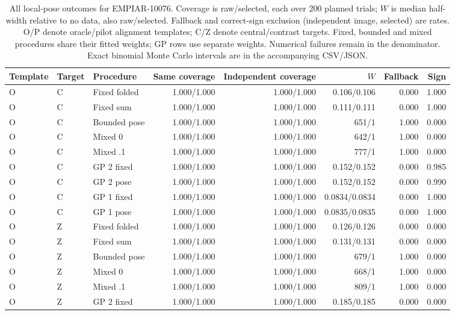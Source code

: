 \begin{table}[!t]
\centering\footnotesize
\caption{All local-pose outcomes for EMPIAR-10076. Coverage is raw/selected, each over 200 planned trials; $W$ is median half-width relative to no data, also raw/selected. Fallback and correct-sign exclusion (independent image, selected) are rates. O/P denote oracle/pilot alignment templates; C/Z denote central/contrast targets. Fixed, bounded and mixed procedures share their fitted weights; GP rows use separate weights. Numerical failures remain in the denominator. Exact binomial Monte Carlo intervals are in the accompanying CSV/JSON.}
\begin{tabular}{lllrrrrr}
\toprule
Template & Target & Procedure & Same coverage & Independent coverage & $W$ & Fallback & Sign \\
\midrule
O & C & Fixed folded & 1.000/1.000 & 1.000/1.000 & 0.106/0.106 & 0.000 & 1.000 \\
O & C & Fixed sum & 1.000/1.000 & 1.000/1.000 & 0.111/0.111 & 0.000 & 1.000 \\
O & C & Bounded pose & 1.000/1.000 & 1.000/1.000 & 651/1 & 1.000 & 0.000 \\
O & C & Mixed 0 & 1.000/1.000 & 1.000/1.000 & 642/1 & 1.000 & 0.000 \\
O & C & Mixed .1 & 1.000/1.000 & 1.000/1.000 & 777/1 & 1.000 & 0.000 \\
O & C & GP 2 fixed & 1.000/1.000 & 1.000/1.000 & 0.152/0.152 & 0.000 & 0.985 \\
O & C & GP 2 pose & 1.000/1.000 & 1.000/1.000 & 0.152/0.152 & 0.000 & 0.990 \\
O & C & GP 1 fixed & 1.000/1.000 & 1.000/1.000 & 0.0834/0.0834 & 0.000 & 1.000 \\
O & C & GP 1 pose & 1.000/1.000 & 1.000/1.000 & 0.0835/0.0835 & 0.000 & 1.000 \\
\addlinespace
O & Z & Fixed folded & 1.000/1.000 & 1.000/1.000 & 0.126/0.126 & 0.000 & 0.000 \\
O & Z & Fixed sum & 1.000/1.000 & 1.000/1.000 & 0.131/0.131 & 0.000 & 0.000 \\
O & Z & Bounded pose & 1.000/1.000 & 1.000/1.000 & 679/1 & 1.000 & 0.000 \\
O & Z & Mixed 0 & 1.000/1.000 & 1.000/1.000 & 668/1 & 1.000 & 0.000 \\
O & Z & Mixed .1 & 1.000/1.000 & 1.000/1.000 & 809/1 & 1.000 & 0.000 \\
O & Z & GP 2 fixed & 1.000/1.000 & 1.000/1.000 & 0.185/0.185 & 0.000 & 0.000 \\

\end{tabular}
\end{table}
